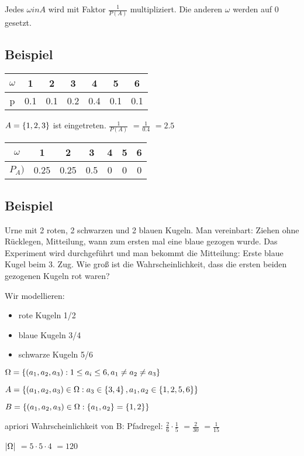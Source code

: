 Jedes $\omega in A$ wird mit Faktor $\frac{1}{P(A)}$ multipliziert. Die anderen $\omega$ werden auf 0 gesetzt. 

\subsection{Beispiel}
\begin{tabular}{|c|c|c|c|c|c|c|}
\hline $\omega$ & 1 & 2 & 3 & 4 & 5 & 6 \\ 
\hline p & 0.1 & 0.1 & 0.2 & 0.4 & 0.1 & 0.1 \\ 
\hline 
\end{tabular} 

$A= \left\lbrace 1,2,3 \right\rbrace $ ist eingetreten. 
$\frac{1}{P(A)}$
$=\frac{1}{0.4}$
$=2.5$

\begin{tabular}{|c|c|c|c|c|c|c|}
\hline $\omega$ & 1 & 2 & 3 & 4 & 5 & 6 \\ 
\hline $P_A)$ & 0.25 & 0.25 & 0.5 & 0 & 0 & 0 \\ 
\hline 
\end{tabular} 

\subsection{Beispiel}
Urne mit 2 roten, 2 schwarzen und 2 blauen Kugeln. Man vereinbart: Ziehen ohne Rücklegen, Mitteilung, wann zum ersten mal eine blaue gezogen wurde. Das Experiment wird durchgeführt und man bekommt die Mitteilung: \glqq Erste blaue Kugel beim 3. Zug. \grqq Wie groß ist die Wahrscheinlichkeit, dass die ersten beiden gezogenen Kugeln rot waren?

Wir modellieren: 
\begin{itemize}
\item rote Kugeln 1/2
\item blaue Kugeln 3/4
\item schwarze Kugeln 5/6
\end{itemize}

$ \Omega =  \left\lbrace (a_1,a_2,a_3) : 1\leq a_i\leq 6, a_1\neq a_2\neq a_3 \right\rbrace  $

$ A= \left\lbrace (a_1,a_2,a_3) \in \Omega : a_3\in  \left\lbrace 3,4 \right\rbrace , a_1,a_2 \in  \left\lbrace 1,2,5,6 \right\rbrace   \right\rbrace $

$ B= \left\lbrace (a_1,a_2,a_3) \in \Omega :  \left\lbrace a_1,a_2 \right\rbrace  =  \left\lbrace 1,2 \right\rbrace  \right\rbrace $

apriori Wahrscheinlichkeit von B: 
Pfadregel: $\frac{2}{6} \cdot \frac{1}{5} $
$=\frac{2}{30}$
$=\frac{1}{15}$

$ \left\vert \Omega \right\vert  $
$=5\cdot 5\cdot 4$
$=120$

